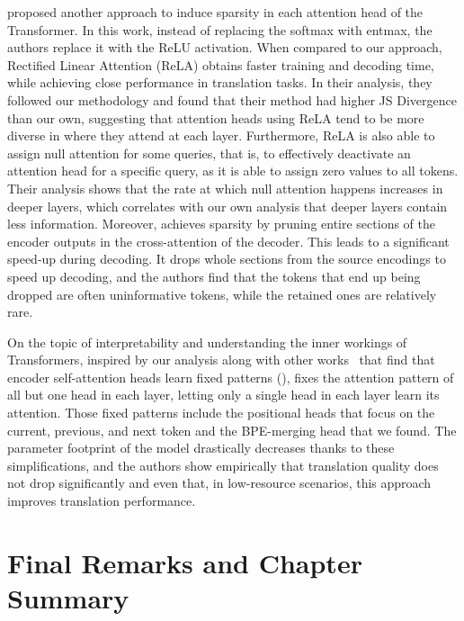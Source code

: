 \citet{zhang2021SparseAttentionLinear} proposed another approach to
induce sparsity in each attention head of the Transformer. In this
work, instead of replacing the softmax with entmax, the authors
replace it with the ReLU activation. When compared to our approach,
Rectified Linear Attention (ReLA) obtains faster training and
decoding time, while achieving close performance in translation
tasks. In their analysis, they followed our methodology and found
that their method had higher JS Divergence than our own, suggesting
that attention heads using ReLA tend to be more diverse in where they
attend at each layer. Furthermore, ReLA is also able to assign null
attention for some queries, that is, to effectively deactivate an
attention head for a specific query, as it is able to assign zero
values to all tokens. Their analysis shows that the rate at which
null attention happens increases in deeper layers, which correlates
with our own analysis that deeper layers contain less information.
Moreover, \citet{zhang2021SparsifyingEncoderOutputs} achieves
sparsity by pruning entire sections of the encoder outputs in the
cross-attention of the decoder. This leads to a significant speed-up
during decoding. It drops whole sections from the source encodings to
speed up decoding, and the authors find that the tokens that end up
being dropped are often uninformative tokens, while the retained ones
are relatively rare.

On the topic of interpretability and understanding the inner workings
of Transformers, inspired by our analysis along with other
works~\citep{voita2019AnalyzingMultiHeadSelfAttention} that find that
encoder self-attention heads learn fixed patterns
(), \citet{raganato2020FixedEncoderSelfAttentiona}
fixes the attention pattern of all but one head in each layer,
letting only a single head in each layer learn its attention. Those
fixed patterns include the positional heads that focus on the
current, previous, and next token and the BPE-merging head that we
found. The parameter footprint of the model drastically decreases
thanks to these simplifications, and the authors show empirically
that translation quality does not drop significantly and even that,
in low-resource scenarios, this approach improves translation
performance.

\section{Final Remarks and Chapter Summary}

